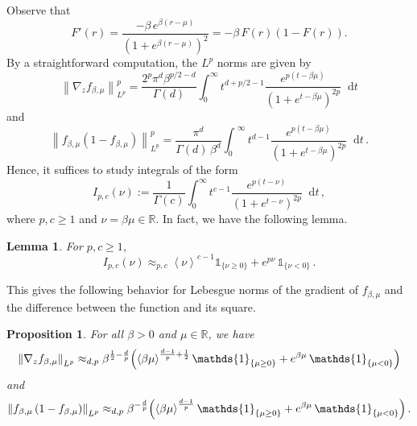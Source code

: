\documentclass[11pt]{amsart}
\theoremstyle{plain}
\newtheorem{lem}[theorem]{Lemma}
\newtheorem{prop}[theorem]{Proposition}
\theoremstyle{definition}
\newcommand		{\RR}		{\mathbb R}			%
\newcommand		{\R}		{\RR}
\newcommand		{\lt}			{\left}				%
\newcommand		{\rt}			{\right}			%
\renewcommand	{\(}			{\lt(}
\renewcommand	{\)}			{\rt)}
\newcommand		{\bangle}[1]	{\lt\langle #1\rt\rangle}
\newcommand		{\weight}[1]	{\bangle{#1}}	%
\newcommand		{\n}[1]			{\lt\lvert #1 \rt\rvert}
\newcommand		{\nrm}[1]		{\lt\lVert #1\rt\rVert}
\newcommand		{\Nrm}[2]		{\nrm{#1}_{#2}}
\newcommand		{\indic}	{\mathds{1}}		%
\renewcommand		{\d}		{\mathop{}\!\mathrm{d}}		%
\newcommand			{\grad}		{\nabla}
\begin{document}
	Observe that
	\begin{equation*}
		F'(r) = \frac{-\beta\,e^{\beta\lt(r-\mu\rt)}}{\lt(1+e^{\beta\lt(r-\mu\rt)}\rt)^2} = -\beta\,F(r)\lt(1-F(r)\rt) .
	\end{equation*}
	By a straightforward computation, the $L^p$ norms are given by
	\begin{equation}\label{eq:classical grad f}
			\Nrm{\nabla_zf_{\beta, \mu}}{L^p}^p 
			= \frac{2^{p}\pi^d \beta^{p/2-d}}{ \Gamma(d)}
			\int_0^\infty t^{d+p/2-1} 
			\frac{e^{p(t-\beta\mu)}}{(1+e^{t-\beta\mu})^{2p}} \d t
	\end{equation}
	 and 
	\begin{equation}\label{eq:classical f(1-f)}
			\Nrm{f_{\beta, \mu}\lt(1-f_{\beta, \mu}\rt)}{L^p}^p
			= \frac{\pi^d}{\Gamma(d)\,\beta^{d}} \int_0^{\;\infty} t^{d-1} \frac{e^{p(t-\beta\mu)}}{(1+e^{t-\beta\mu})^{2p}} \d t\,.
	\end{equation}
	Hence, it suffices to study integrals of the form
	\begin{equation*}
		I_{p,c}(\nu) := \frac{1}{\Gamma(c)}\int_0^{\infty} t^{c-1}
			\frac{e^{p(t-\nu)}}{(1+e^{t-\nu})^{2p}} \d t \,,
	\end{equation*}
	where $p, c\ge 1$ and $\nu = \beta\mu \in \R$. In fact, we have the following lemma.
	
	\begin{lem}\label{lem:I_{p,c}}
		For $p, c \ge 1$, 
		\begin{equation*}
			I_{p, c}(\nu) \approx_{p, c} \weight{\nu}^{c-1} \indic_{\{\nu \ge 0\}} + e^{p\nu}\, \indic_{\{\nu < 0\}} \, .
		\end{equation*}
	\end{lem}
	This gives the following behavior for Lebesgue norms of the gradient of $f_{\beta,\mu}$ and the difference between the function and its square.
	\begin{prop}\label{prop:classical_case}
		For all $\beta>0$ and $\mu\in \R$, we have
		\begin{equation*}
			\Nrm{\grad_z f_{\beta, \mu}}{L^p} \approx_{d,p} \beta^{\frac{1}{2}-\frac{d}{p}} \Bigl( \weight{\beta\mu}^{\frac{d-1}{p}+\frac12} \indic_{\{\mu \ge 0\}} + e^{\beta\mu}\, \indic_{\{\mu < 0\}}\Bigr)
		\end{equation*}
		and
		\begin{equation*}
			\Nrm{f_{\beta, \mu} \lt(1-f_{\beta, \mu}\rt)}{L^p} \approx_{d,p} \beta^{-\frac{d}{p}}\Bigl( \weight{\beta\mu}^{\frac{d-1}{p}} \indic_{\{\mu \ge 0\}} + e^{\beta\mu} \,\indic_{\{\mu < 0\}} \Bigr)\,.
		\end{equation*}
	\end{prop}
\end{document}
